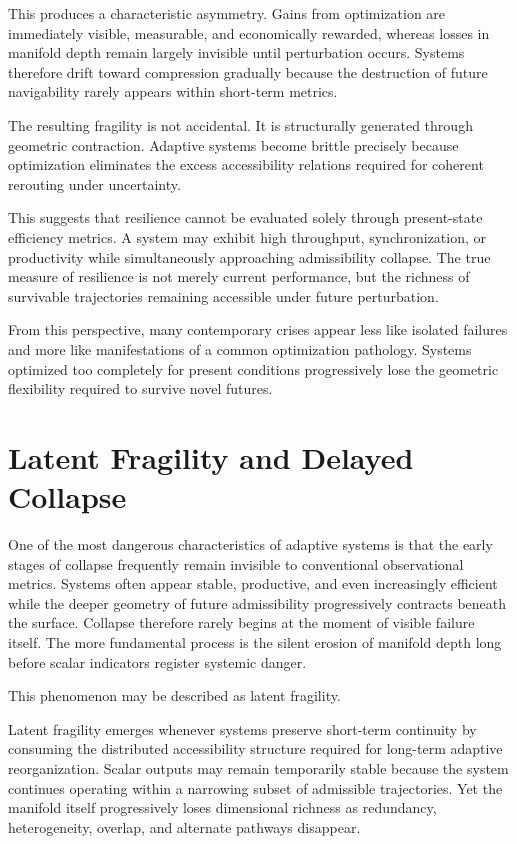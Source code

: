 \documentclass[11pt,a4paper]{article}
\begin{document}
This produces a characteristic asymmetry. Gains from optimization are immediately visible, measurable, and economically rewarded, whereas losses in manifold depth remain largely invisible until perturbation occurs. Systems therefore drift toward compression gradually because the destruction of future navigability rarely appears within short-term metrics.

The resulting fragility is not accidental. It is structurally generated through geometric contraction. Adaptive systems become brittle precisely because optimization eliminates the excess accessibility relations required for coherent rerouting under uncertainty.

This suggests that resilience cannot be evaluated solely through present-state efficiency metrics. A system may exhibit high throughput, synchronization, or productivity while simultaneously approaching admissibility collapse. The true measure of resilience is not merely current performance, but the richness of survivable trajectories remaining accessible under future perturbation.

From this perspective, many contemporary crises appear less like isolated failures and more like manifestations of a common optimization pathology. Systems optimized too completely for present conditions progressively lose the geometric flexibility required to survive novel futures.

\newpage

\section{Latent Fragility and Delayed Collapse}

One of the most dangerous characteristics of adaptive systems is that the early stages of collapse frequently remain invisible to conventional observational metrics. Systems often appear stable, productive, and even increasingly efficient while the deeper geometry of future admissibility progressively contracts beneath the surface. Collapse therefore rarely begins at the moment of visible failure itself. The more fundamental process is the silent erosion of manifold depth long before scalar indicators register systemic danger.

This phenomenon may be described as latent fragility.

Latent fragility emerges whenever systems preserve short-term continuity by consuming the distributed accessibility structure required for long-term adaptive reorganization. Scalar outputs may remain temporarily stable because the system continues operating within a narrowing subset of admissible trajectories. Yet the manifold itself progressively loses dimensional richness as redundancy, heterogeneity, overlap, and alternate pathways disappear.
\end{document}
